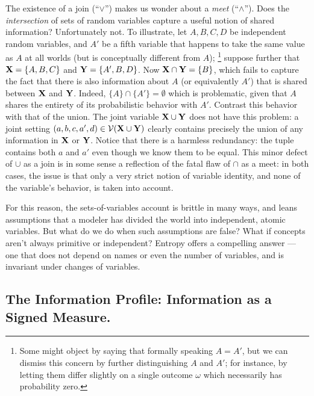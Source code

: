 \documentclass{article}
\begin{document}
    The existence of a join (``$\lor$'') makes us wonder about a \emph{meet} (``$\land$''). Does the \emph{intersection} of sets of random variables capture a useful notion of shared information? Unfortunately not.
    To illustrate, let $A, B, C, D$ be independent random variables, and $A'$ be a fifth variable that happens to take the same value as $A$ at all worlds (but is conceptually different from $A$);%
        \footnote{Some might object by saying that formally speaking $A = A'$, but we can dismiss this concern by further distinguishing $A$ and $A'$; for instance, by letting them differ slightly on a single outcome $\omega$ which necessarily has probability zero.}
    suppose further that $\mathbf X = \{A,B,C\}$ and $\mathbf Y = \{A', B, D\}$. Now $\mathbf X \cap \mathbf Y = \{B\}$, which fails to capture the fact that there is also information about $A$ (or equivalently $A'$) that is shared between $\mathbf X$ and $\mathbf Y$. Indeed, $\{A\} \cap \{A'\} = \emptyset$ which is problematic, given that $A$ shares the entirety of its probabilistic behavior with $A'$.
    Contrast this behavior with that of the union.  The joint variable $\mathbf X \cup \mathbf Y$ does not have this problem: a joint setting $(a,b,c,a',d) \in \mathcal V(\mathbf X \cup \mathbf Y)$ clearly contains precisely the union of any information in $\mathbf X$ or $\mathbf Y$. Notice that there is a harmless redundancy: the tuple contains both $a$ and $a'$ even though we know them to be equal. This minor defect of $\cup$ as a join is in some sense a reflection of the fatal flaw of $\cap$ as a meet: in both cases, the issue is that only a very strict notion of variable identity, and none of the variable's behavior, is taken into account.

    For this reason, the sets-of-variables account is brittle in many ways, and leans assumptions that a modeler has divided the world into independent, atomic variables. But what do we do when such assumptions are false? What if concepts aren't always primitive or independent? Entropy offers a compelling answer --- one that does not depend on names or even the number of variables, and is invariant under changes of variables.

    \subsection{The Information Profile: Information as a Signed Measure.}






\end{document}
